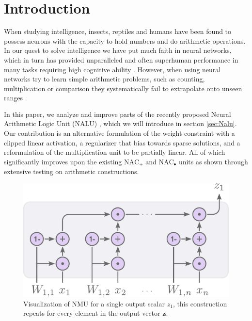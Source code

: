 \section{Introduction}
When studying intelligence, insects, reptiles and humans have been found to possess neurons with the capacity to hold numbers and do arithmetic operations\cite{nieder-neuronal-number,rugani-arithmetic-chicks,gallistel-numbers-in-brain}.
In our quest to solve intelligence we have put much faith in neural networks, which in turn has provided unparalleled and often superhuman performance in many tasks requiring high cognitive ability \cite{natureGo,googleNMT,resnet}.
However, when using neural networks try to learn simple arithmetic problems, such as counting, multiplication or comparison they systematically fail to extrapolate onto unseen ranges \cite{stillNotSystematic,suzgun2019evaluating,trask-nalu}.

In this paper, we analyze and improve parts of the recently proposed Neural Arithmetic Logic Unit (NALU) \cite{trask-nalu}, which we will introduce in section \ref{sec:Nalu}. Our contribution is an alternative formulation of the weight constraint with a clipped linear activation, a regularizer that bias towards sparse solutions, and a reformulation of the multiplication unit to be partially linear. All of which significantly improves upon the existing $\text{NAC}_{+}$ and $\text{NAC}_{\bullet}$ units as shown through extensive testing on arithmetic constructions.%

\begin{figure}[h]
\centering
\includegraphics[scale=0.8]{graphics/nmu.pdf}
\caption{Visualization of NMU for a single output scalar $z_1$, this construction repeats for every element in the output vector $\mathbf{z}$.}
\end{figure}

